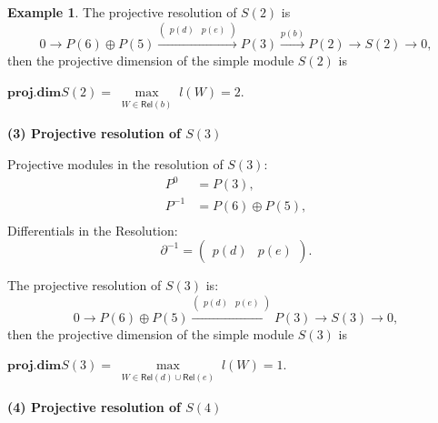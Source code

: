 \documentclass[11pt]{amsart}
\numberwithin{equation}{section}
\theoremstyle{definition}
\newtheorem{example}[theorem]{Example}
\begin{document}
\begin{example}
	The projective resolution of \( S(2) \) is
	\[
	0 \to P(6) \oplus P(5) \xrightarrow{\begin{pmatrix} p(d) & p(e) \end{pmatrix}} P(3) \xrightarrow{p(b)} P(2) \to S(2) \to 0,
	\]
	then the projective dimension of the simple module \( S(2) \) is 
	\begin{center}
		\( \textbf{proj.dim} S(2) = \max\limits_{\substack{W \in \mathsf{Rel}(b)}} l(W) = 2 \).
	\end{center}
	\textbf{(3)  Projective resolution of \( S(3) \)}
	
	Projective modules in the resolution of \( S(3) \): 
	\[
	\begin{aligned}
		P^0    &=  P(3), \\
		P^{-1} &=  P(6) \oplus P(5), \\
	\end{aligned}
	\]
	Differentials in the Resolution:
	\[
	\partial^{-1} = \begin{pmatrix} p(d) & p(e) \end{pmatrix}.
	\]
	
	\noindent The projective resolution of \( S(3) \) is:
	\[
	0 \to P(6) \oplus P(5) \xrightarrow{\begin{pmatrix} p(d) & p(e) \end{pmatrix}} P(3) \to S(3) \to 0,
	\]
	then the projective dimension of the simple module \( S(3) \) is 
\begin{center}
		\( \textbf{proj.dim}S(3) = \max\limits_{\substack{W \in \mathsf{Rel}(d) \cup \mathsf{Rel}(e)}}l(W) = 1 \).
\end{center}
	\textbf{(4)  Projective resolution of \( S(4) \)}
	

\end{example}
\end{document}
